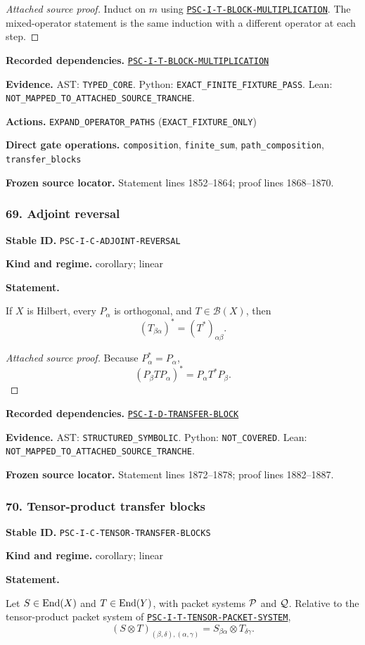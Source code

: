 \documentclass[a4paper,11pt]{article}
\newcommand{\field}[2]{\noindent\textbf{#1.} #2\par}
\begin{document}
\begin{proof}[Attached source proof]
Induct on $m$ using \hyperref[rec:PSC-I-T-BLOCK-MULTIPLICATION]{\nolinkurl{PSC-I-T-BLOCK-MULTIPLICATION}}.  The mixed-operator statement is the same induction with a different operator at each step.
\end{proof}
\field{Recorded dependencies}{\hyperref[rec:PSC-I-T-BLOCK-MULTIPLICATION]{\nolinkurl{PSC-I-T-BLOCK-MULTIPLICATION}}}
\field{Evidence}{AST: \nolinkurl{TYPED_CORE}. Python: \nolinkurl{EXACT_FINITE_FIXTURE_PASS}. Lean: \nolinkurl{NOT_MAPPED_TO_ATTACHED_SOURCE_TRANCHE}.}
\field{Actions}{\nolinkurl{EXPAND_OPERATOR_PATHS} (\nolinkurl{EXACT_FIXTURE_ONLY})}
\field{Direct gate operations}{\nolinkurl{composition}, \nolinkurl{finite_sum}, \nolinkurl{path_composition}, \nolinkurl{transfer_blocks}}
\field{Frozen source locator}{Statement lines 1852--1864; proof lines 1868--1870.}
\subsubsection*{69. Adjoint reversal}
\label{rec:PSC-I-C-ADJOINT-REVERSAL}
\field{Stable ID}{\nolinkurl{PSC-I-C-ADJOINT-REVERSAL}}
\field{Kind and regime}{corollary; linear}
\textbf{Statement.}\par
If $X$ is Hilbert, every $P_\alpha$ is orthogonal, and $T\in\mathcal B(X)$, then
\[
\boxed{(T_{\beta\alpha})^*=(T^*)_{\alpha\beta}.}
\]

\begin{proof}[Attached source proof]
Because $P_\alpha^*=P_\alpha$,
\[
(P_\beta TP_\alpha)^*=P_\alpha T^*P_\beta.
\]
\end{proof}
\field{Recorded dependencies}{\hyperref[rec:PSC-I-D-TRANSFER-BLOCK]{\nolinkurl{PSC-I-D-TRANSFER-BLOCK}}}
\field{Evidence}{AST: \nolinkurl{STRUCTURED_SYMBOLIC}. Python: \nolinkurl{NOT_COVERED}. Lean: \nolinkurl{NOT_MAPPED_TO_ATTACHED_SOURCE_TRANCHE}.}
\field{Frozen source locator}{Statement lines 1872--1878; proof lines 1882--1887.}
\subsubsection*{70. Tensor-product transfer blocks}
\label{rec:PSC-I-C-TENSOR-TRANSFER-BLOCKS}
\field{Stable ID}{\nolinkurl{PSC-I-C-TENSOR-TRANSFER-BLOCKS}}
\field{Kind and regime}{corollary; linear}
\textbf{Statement.}\par
Let \(S\in\operatorname{End}(X)\) and \(T\in\operatorname{End}(Y)\), with packet systems \(\mathcal P\) and \(\mathcal Q\).  Relative to the tensor-product packet system of \hyperref[rec:PSC-I-T-TENSOR-PACKET-SYSTEM]{\nolinkurl{PSC-I-T-TENSOR-PACKET-SYSTEM}},
\[
\boxed{
(S\otimes T)_{(\beta,\delta),(\alpha,\gamma)}
=
S_{\beta\alpha}\otimes T_{\delta\gamma}.
}
\]
\end{document}
